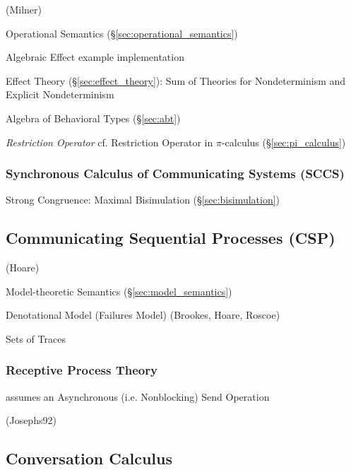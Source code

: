 (Milner)

Operational Semantics (\S\ref{sec:operational_semantics})

Algebraic Effect example implementation \cite{plotkin-pretnar13}

Effect Theory (\S\ref{sec:effect_theory}): Sum of Theories for
Nondeterminism and Explicit Nondeterminism \cite{plotkin-pretnar13}

\fist Algebra of Behavioral Types (\S\ref{sec:abt})

\emph{Restriction Operator} \fist cf. Restriction Operator in $\pi$-calculus
(\S\ref{sec:pi_calculus})



\subsubsection{Synchronous Calculus of Communicating Systems (SCCS)}
\label{sec:sccs}

Strong Congruence: Maximal Bisimulation (\S\ref{sec:bisimulation})
\cite{aczel88}



\subsection{Communicating Sequential Processes (CSP)}\label{sec:csp}

(Hoare)

Model-theoretic Semantics (\S\ref{sec:model_semantics})

Denotational Model (Failures Model) (Brookes, Hoare, Roscoe)

Sets of Traces



\subsubsection{Receptive Process Theory}\label{sec:receptive_process}

assumes an Asynchronous (i.e. Nonblocking) Send Operation

(Josephs92)



\subsection{Conversation Calculus}\label{sec:conversation_calculus}


